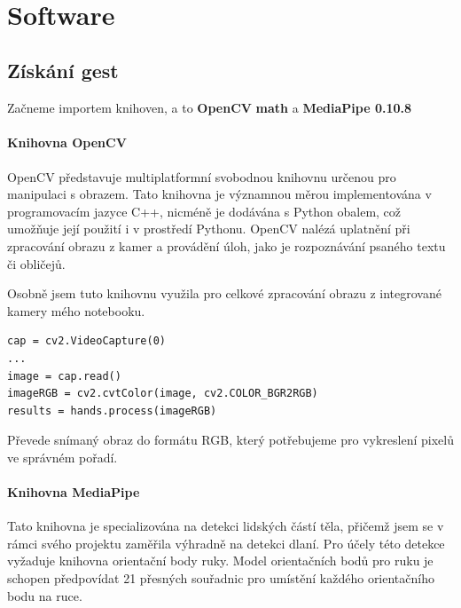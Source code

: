\documentclass[12pt, a4paper,
twoside,        %
openright
]{report}
\let\oldchapter\chapter
\renewcommand{\chapter}{
	\clearpage
	\pagestyle{fancy}
	\fancyhf{}
	\renewcommand{\headrulewidth}{0pt}
	\fancyfoot[c]{\thepage}
	\
	\oldchapter
}
\renewcommand{\headrulewidth}{0.025pt}
\begin{document}
{\newpage




\chapter{Software}

\section{Získání gest}
Začneme importem knihoven, a to \textbf{OpenCV}  \textbf{math} a \textbf{MediaPipe 0.10.8}  

\subsubsection{Knihovna OpenCV}

OpenCV představuje multiplatformní svobodnou knihovnu určenou pro manipulaci s obrazem. Tato knihovna je významnou měrou implementována v programovacím jazyce C++, nicméně je dodávána s Python obalem, což umožňuje její použití i v prostředí Pythonu. OpenCV nalézá uplatnění při zpracování obrazu z kamer a provádění úloh, jako je rozpoznávání psaného textu či obličejů.

Osobně jsem tuto knihovnu využila pro celkové zpracování obrazu z integrované kamery mého notebooku.

\begin{lstlisting}[style=Python, caption={Obraz, a jeho převedení do správného formátu}]
cap = cv2.VideoCapture(0)
...
image = cap.read()
imageRGB = cv2.cvtColor(image, cv2.COLOR_BGR2RGB)
results = hands.process(imageRGB)
\end{lstlisting}

Převede snímaný obraz do formátu RGB, který potřebujeme pro vykreslení pixelů ve správném pořadí.

\subsubsection{Knihovna MediaPipe}
Tato knihovna je specializována na detekci lidských částí těla, přičemž jsem se v rámci svého projektu zaměřila výhradně na detekci dlaní. Pro účely této detekce vyžaduje knihovna orientační body ruky. Model orientačních bodů pro ruku je schopen předpovídat 21 přesných souřadnic pro umístění každého orientačního bodu na ruce.



\begin{figure}[h]
	

\end{figure}}
\end{document}
